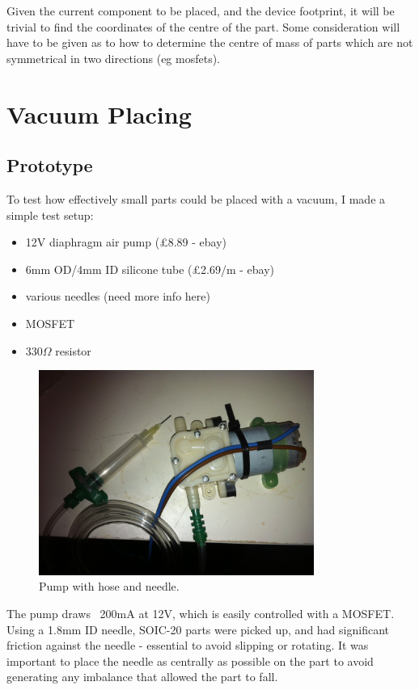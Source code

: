 \documentclass[a4paper,11pt]{article}  %
\begin{document}
Given the current component to be placed, and the device footprint, it will be trivial to find the coordinates of the centre of the part. Some
consideration will have to be given as to how to determine the centre of mass of parts which are not symmetrical in two directions (eg mosfets).
	   
\section{Vacuum Placing}
\subsection{Prototype}
To test how effectively small parts could be placed with a vacuum, I made a simple test setup:

\begin{itemize} \itemsep0em
	\item	12V diaphragm air pump (£8.89 - ebay)
	\item	6mm OD/4mm ID silicone tube (£2.69/m - ebay)
	\item	various needles (need more info here)
	\item	MOSFET
	\item	330$\Omega$ resistor
\end{itemize}

\begin{figure}[ht!]
\centering
\includegraphics[width=90mm]{resources/pump_and_hose.jpg}
\caption{Pump with hose and needle.}
\label{hose and needle}
\end{figure}

The pump draws ~200mA at 12V, which is easily controlled with a MOSFET. Using a 1.8mm ID needle, SOIC-20 parts were picked up, 
and had significant friction against the needle - essential to avoid slipping or rotating. It was important to place the needle 
as centrally as possible on the part to avoid generating any imbalance that allowed the part to fall. 
\end{document}
